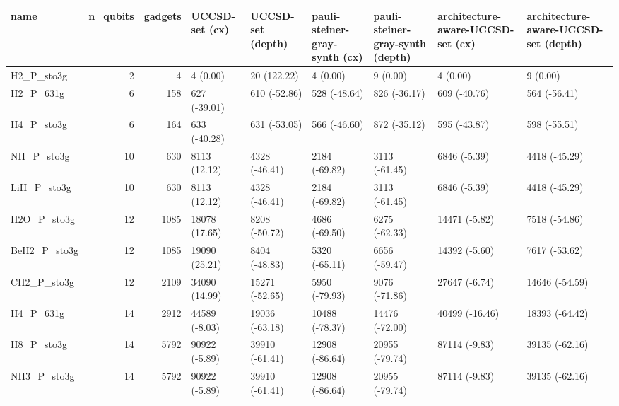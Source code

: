 \begin{tabular}{lrrllllll}
\toprule
name & n\_qubits & gadgets & UCCSD-set (cx) & UCCSD-set (depth) & pauli-steiner-gray-synth (cx) & pauli-steiner-gray-synth (depth) & architecture-aware-UCCSD-set (cx) & architecture-aware-UCCSD-set (depth) \\
\midrule
H2\_P\_sto3g & 2 & 4 & 4 (0.00) & 20 (122.22) & 4 (0.00) & 9 (0.00) & 4 (0.00) & 9 (0.00) \\
H2\_P\_631g & 6 & 158 & 627 (-39.01) & 610 (-52.86) & 528 (-48.64) & 826 (-36.17) & 609 (-40.76) & 564 (-56.41) \\
H4\_P\_sto3g & 6 & 164 & 633 (-40.28) & 631 (-53.05) & 566 (-46.60) & 872 (-35.12) & 595 (-43.87) & 598 (-55.51) \\
NH\_P\_sto3g & 10 & 630 & 8113 (12.12) & 4328 (-46.41) & 2184 (-69.82) & 3113 (-61.45) & 6846 (-5.39) & 4418 (-45.29) \\
LiH\_P\_sto3g & 10 & 630 & 8113 (12.12) & 4328 (-46.41) & 2184 (-69.82) & 3113 (-61.45) & 6846 (-5.39) & 4418 (-45.29) \\
H2O\_P\_sto3g & 12 & 1085 & 18078 (17.65) & 8208 (-50.72) & 4686 (-69.50) & 6275 (-62.33) & 14471 (-5.82) & 7518 (-54.86) \\
BeH2\_P\_sto3g & 12 & 1085 & 19090 (25.21) & 8404 (-48.83) & 5320 (-65.11) & 6656 (-59.47) & 14392 (-5.60) & 7617 (-53.62) \\
CH2\_P\_sto3g & 12 & 2109 & 34090 (14.99) & 15271 (-52.65) & 5950 (-79.93) & 9076 (-71.86) & 27647 (-6.74) & 14646 (-54.59) \\
H4\_P\_631g & 14 & 2912 & 44589 (-8.03) & 19036 (-63.18) & 10488 (-78.37) & 14476 (-72.00) & 40499 (-16.46) & 18393 (-64.42) \\
H8\_P\_sto3g & 14 & 5792 & 90922 (-5.89) & 39910 (-61.41) & 12908 (-86.64) & 20955 (-79.74) & 87114 (-9.83) & 39135 (-62.16) \\
NH3\_P\_sto3g & 14 & 5792 & 90922 (-5.89) & 39910 (-61.41) & 12908 (-86.64) & 20955 (-79.74) & 87114 (-9.83) & 39135 (-62.16) \\
\bottomrule
\end{tabular}
